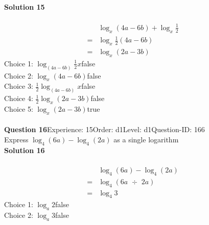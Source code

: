 \documentclass{article}
\begin{document}
\noindent\textbf{Solution 15}\\[2pt]
\\[-35pt]\begin{align*}
&\log_{x}(4a-6b)+\log_{x}\displaystyle\frac{1}{2}\\[2pt]
=&\log_{x}\displaystyle\frac{1}{2}(4a-6b)\\[2pt]
=&\log_{x}(2a-3b)
\end{align*}
Choice 1: \hspace{20pt}$\log_{(4a-6b)}\displaystyle\frac{1}{2}x$\hspace{20pt}false\\
Choice 2: \hspace{20pt}$\log_{x}(4a-6b)$\hspace{20pt}false\\
Choice 3: \hspace{20pt}$\displaystyle\frac{1}{2}\log_{(4a-6b)}x$\hspace{20pt}false\\
Choice 4: \hspace{20pt}$\displaystyle\frac{1}{2}\log_{x}(2a-3b)$\hspace{20pt}false\\
Choice 5: \hspace{20pt}$\log_{x}(2a-3b)$\hspace{20pt}true\\
\\[4pt]
\noindent\textbf{Question 16}\hspace{20pt}Experience: 15\hspace{20pt}Order: d1\hspace{20pt}Level: d1\hspace{20pt}Question-ID: 166\\[2pt]
Express $\log_{4}(6a)-\log_{4}(2a)$ as a single logarithm\\[4pt]
\noindent\textbf{Solution 16}\\[2pt]
\\[-35pt]\begin{align*}
&\log_{4}(6a)-\log_{4}(2a)\\[2pt]
=&\log_{4}(6a \,\, \div \,\, 2a)\\[2pt]
=&\log_{4}3
\end{align*}
Choice 1: \hspace{20pt}$\log_{a}2$\hspace{20pt}false\\
Choice 2: \hspace{20pt}$\log_{a}3$\hspace{20pt}false\\
\end{document}
